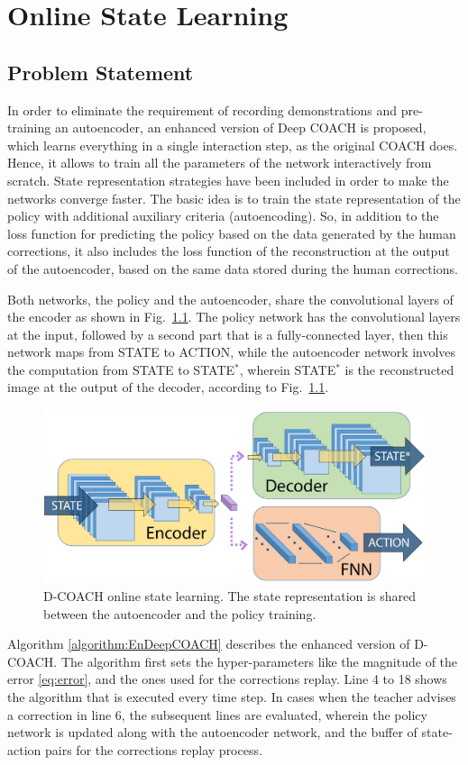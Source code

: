 \chapter{Online State Learning}
\section{Problem Statement}
In order to eliminate the requirement of recording demonstrations and pre-training an autoencoder, an enhanced version of Deep COACH is proposed, which learns everything in a single interaction step, as the original COACH does. Hence, it allows to train all the parameters of the network interactively from scratch. State representation strategies have been included in order to make the networks converge faster. The basic idea is to train the state representation of the policy with additional auxiliary criteria (autoencoding). So, in addition to the loss function for predicting the policy based on the data generated by the human corrections, it also includes the loss function of the reconstruction at the output of the autoencoder, based on the same data stored during the human corrections. 

Both networks, the policy and the autoencoder, share the convolutional layers of the encoder as shown in Fig.~\ref{fig:msim}. The policy network has the convolutional layers at the input, followed by a second part that is a fully-connected layer, then this network maps from STATE to ACTION, while the autoencoder network involves the computation from STATE to STATE$^{*}$, wherein  STATE$^{*}$ is the reconstructed image at the output of the decoder, according to Fig.~\ref{fig:msim}.

\begin{figure}[H]
    \centering
    \includegraphics[width=0.6\linewidth]{imagenes/cap2/m2.pdf}
    \caption{D-COACH online state learning. The state representation is shared between the autoencoder and the policy training.}
    \label{fig:msim}
\end{figure}

Algorithm \ref{algorithm:EnDeepCOACH} describes the enhanced version of D-COACH. The algorithm first sets the hyper-parameters like the magnitude of the error \eqref{eq:error}, and the ones used for the corrections replay. Line 4 to 18 shows the algorithm that is executed every time step. In cases when the teacher advises a correction in line 6, the subsequent lines are evaluated, wherein the policy network is updated along with the autoencoder network, and the buffer of state-action pairs for the corrections replay process.

